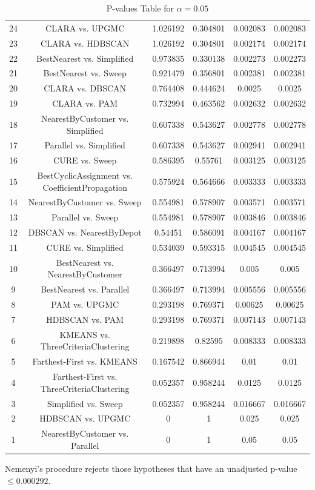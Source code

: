 \documentclass[a4paper,10pt]{article}
\begin{document}
\begin{landscape}
\begin{table}[!htp]
\begin{tabular}{cccccc}
24&CLARA vs. UPGMC&1.026192&0.304801&0.002083&0.002083\\
23&CLARA vs. HDBSCAN&1.026192&0.304801&0.002174&0.002174\\
22&BestNearest vs. Simplified&0.973835&0.330138&0.002273&0.002273\\
21&BestNearest vs. Sweep&0.921479&0.356801&0.002381&0.002381\\
20&CLARA vs. DBSCAN&0.764408&0.444624&0.0025&0.0025\\
19&CLARA vs. PAM&0.732994&0.463562&0.002632&0.002632\\
18&NearestByCustomer vs. Simplified&0.607338&0.543627&0.002778&0.002778\\
17&Parallel vs. Simplified&0.607338&0.543627&0.002941&0.002941\\
16&CURE vs. Sweep&0.586395&0.55761&0.003125&0.003125\\
15&BestCyclicAssignment vs. CoefficientPropagation&0.575924&0.564666&0.003333&0.003333\\
14&NearestByCustomer vs. Sweep&0.554981&0.578907&0.003571&0.003571\\
13&Parallel vs. Sweep&0.554981&0.578907&0.003846&0.003846\\
12&DBSCAN vs. NearestByDepot&0.54451&0.586091&0.004167&0.004167\\
11&CURE vs. Simplified&0.534039&0.593315&0.004545&0.004545\\
10&BestNearest vs. NearestByCustomer&0.366497&0.713994&0.005&0.005\\
9&BestNearest vs. Parallel&0.366497&0.713994&0.005556&0.005556\\
8&PAM vs. UPGMC&0.293198&0.769371&0.00625&0.00625\\
7&HDBSCAN vs. PAM&0.293198&0.769371&0.007143&0.007143\\
6&KMEANS vs. ThreeCriteriaClustering&0.219898&0.82595&0.008333&0.008333\\
5&Farthest-First vs. KMEANS&0.167542&0.866944&0.01&0.01\\
4&Farthest-First vs. ThreeCriteriaClustering&0.052357&0.958244&0.0125&0.0125\\
3&Simplified vs. Sweep&0.052357&0.958244&0.016667&0.016667\\
2&HDBSCAN vs. UPGMC&0&1&0.025&0.025\\
1&NearestByCustomer vs. Parallel&0&1&0.05&0.05\\
\hline
\end{tabular}
\caption{P-values Table for $\alpha=0.05$}
\end{table}Nemenyi's procedure rejects those hypotheses that have an unadjusted p-value $\le0.000292$.


\end{landscape}
\end{document}
